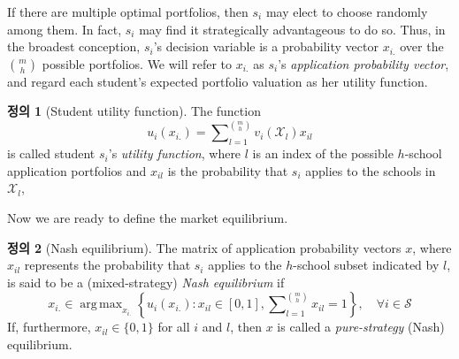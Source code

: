 \documentclass[12pt]{article} %
\DeclareMathOperator*{\argmax}{arg\,max}
\theoremstyle{definition}
\newtheorem{definition}{Definition}
\theoremstyle{definition}
\newtheorem{definition}{정의}
\begin{document}
If there are multiple optimal portfolios, then $s_i$ may elect to choose randomly among them. In fact, $s_i$ may find it strategically advantageous to do so. Thus, in the broadest conception, $s_i$'s decision variable is a probability vector $x_{i.}$ over the $\binom{m}{h}$ possible portfolios. We will refer to $x_{i.}$ as $s_i$'s \emph{application probability vector}, and regard each student's expected portfolio valuation as her utility function.
\begin{definition}[Student utility function]
The function
\begin{equation} \label{mixedstrategystudentutility}
u_i(x_{i.}) = \sum\nolimits_{l=1}^{\binom{m}{h}} v_i(\mathcal{X}_l) x_{il}
\end{equation}
is called student $s_i$'s \emph{utility function}, where $l$ is an index of the possible $h$-school application portfolios and $x_{il}$ is the probability that $s_i$ applies to the schools in $\mathcal{X}_l$,
\end{definition}
Now we are ready to define the market equilibrium.
\begin{definition}[Nash equilibrium]
The matrix of application probability vectors $x$, where $x_{il}$ represents the probability that $s_i$ applies to the $h$-school subset indicated by $l$, is said to be a (mixed-strategy) \emph{Nash equilibrium} if 
\begin{equation}
x_{i.} \in \argmax_{x_{i.}} \left\{ u_i(x_{i.}) : x_{il} \in [0, 1], \sum\nolimits_{l=1}^{\binom{m}{h}} x_{il} = 1 \right\},\quad \forall i \in \mathcal{S}
\end{equation}
If, furthermore, $x_{il} \in \{0, 1\}$ for all $i$ and $l$, then $x$ is called a \emph{pure-strategy} (Nash) equilibrium.
\end{definition}
\end{document}
